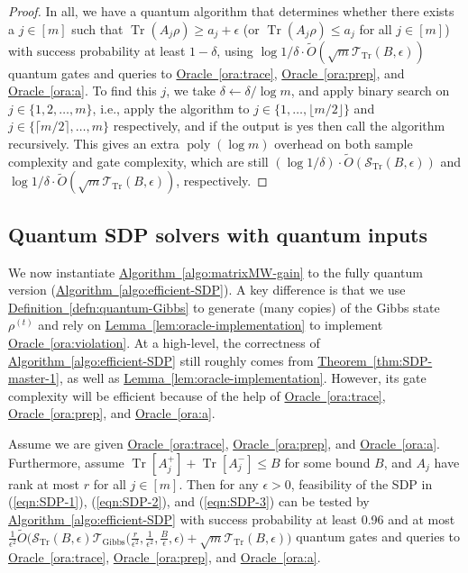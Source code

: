 \documentclass[a4paper,UKenglish,cleveref, autoref]{lipics-v2019}
\theoremstyle{remark}
\numberwithin{equation}{section}
\numberwithin{oracle}{section}
\numberwithin{remark}{section}
\newcommand{\eqn}[1]{(\ref{eqn:#1})}
\newcommand{\ora}[1]{\hyperref[ora:#1]{Oracle~\ref*{ora:#1}}}
\newcommand{\thm}[1]{\hyperref[thm:#1]{Theorem~\ref*{thm:#1}}}
\newcommand{\defn}[1]{\hyperref[defn:#1]{Definition~\ref*{defn:#1}}}
\newcommand{\lem}[1]{\hyperref[lem:#1]{Lemma~\ref*{lem:#1}}}
\newcommand{\algo}[1]{\hyperref[algo:#1]{Algorithm~\ref*{algo:#1}}}
\newcommand{\range}[1]{[#1]}
\DeclareMathOperator{\poly}{poly}
\DeclareMathOperator{\tr}{Tr}
\DeclareMathOperator{\Tr}{Tr}
\begin{document}
\begin{proof}
In all, we have a quantum algorithm that determines whether there exists a $j\in\range{m}$ such that $\tr(A_{j} \rho)\geq a_{j}+\epsilon$ (or $\tr(A_{j} \rho)\leq a_{j}$ for all $j\in\range{m}$) with success probability at least $1-\delta$, using $\log 1/\delta\cdot\tilde{O}(\sqrt{m}\mathcal{T}_{\tr}(B,\epsilon))$ quantum gates and queries to \ora{trace}, \ora{prep}, and \ora{a}. To find this $j$, we take $\delta\leftarrow\delta/\log m$, and apply binary search on $j\in\{1,2,\ldots,m\}$, i.e., apply the algorithm to $j\in\{1,\ldots,\lfloor m/2\rfloor\}$ and $j\in\{\lceil m/2\rceil,\ldots,m\}$ respectively, and if the output is yes then call the algorithm recursively. This gives an extra $\poly(\log m)$ overhead on both sample complexity and gate complexity, which are still $(\log 1/\delta)\cdot\tilde{O}(\mathcal{S}_{\tr}(B,\epsilon))$ and $\log 1/\delta\cdot\tilde{O}(\sqrt{m}\mathcal{T}_{\tr}(B,\epsilon))$, respectively.
\end{proof}

\subsection{Quantum SDP solvers with quantum inputs}
We now instantiate \algo{matrixMW-gain} to the fully quantum version (\algo{efficient-SDP}). A key difference is that we use \defn{quantum-Gibbs} to generate (many copies) of the Gibbs state $\rho^{(t)}$ and rely on \lem{oracle-implementation} to implement \ora{violation}.
At a high-level, the correctness of \algo{efficient-SDP} still roughly comes from \thm{SDP-master-1}, as well as \lem{oracle-implementation}. However, its gate complexity will be efficient because of the help of \ora{trace}, \ora{prep}, and \ora{a}.

\begin{theorem}\label{thm:SDP-feasibility-testing}
Assume we are given \ora{trace}, \ora{prep}, and \ora{a}. Furthermore, assume $\Tr[A_{j}^{+}]+\Tr[A_{j}^{-}]\leq B$ for some bound $B$, and $A_{j}$ have rank at most $r$ for all $j\in\range{m}$. Then for any $\epsilon>0$, feasibility of the SDP in \eqn{SDP-1}, \eqn{SDP-2}, and \eqn{SDP-3} can be tested by \algo{efficient-SDP} with success probability at least 0.96 and at most $\frac{1}{\epsilon^{2}}\tilde{O}\big(\mathcal{S}_{\tr}(B,\epsilon)\mathcal{T}_{\text{Gibbs}}\big(\frac{r}{\epsilon^{2}},\frac{1}{\epsilon^{2}},\frac{B}{\epsilon},\epsilon\big)+\sqrt{m}\mathcal{T}_{\tr}(B,\epsilon)\big)$ quantum gates and queries to \ora{trace}, \ora{prep}, and \ora{a}.
\end{theorem}
\end{document}
